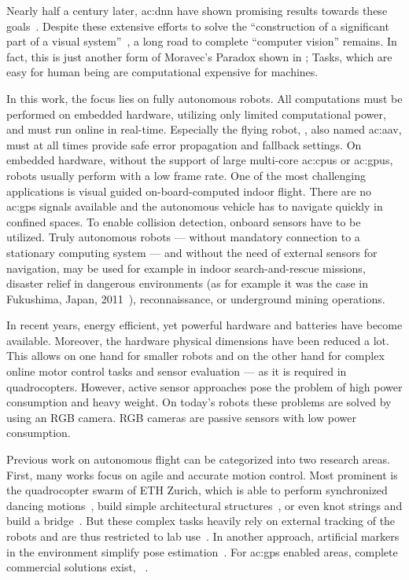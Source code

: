 Nearly half a century later, \acrlong{ac:dnn} have shown promising results towards these goals~\cite{krizhevsky2012imagenet, deng2009imagenet, kim2014convolutional}.
Despite these extensive efforts to solve the ``construction of a significant part of a visual system''~\cite[p. 1]{papert1966summer}, a long road to complete ``computer vision'' remains.
In fact, this is just another form of Moravec's Paradox shown in ; Tasks, which are easy for human being are computational expensive for machines.

In this work, the focus lies on fully autonomous robots.
All computations must be performed on embedded hardware, \ie utilizing only limited computational power, and must run online in real-time.
Especially the flying robot, , also named \gls{ac:aav}, must at all times provide safe error propagation and fallback settings.
On embedded hardware, without the support of large multi-core \glspl{ac:cpu} or \glspl{ac:gpu}, robots usually perform with a low frame rate.
One of the most challenging applications is visual guided on-board-computed indoor flight.
There are no \gls{ac:gps} signals available and the autonomous vehicle has to navigate quickly in confined spaces.
To enable collision detection, onboard sensors have to be utilized.
Truly autonomous robots --- without mandatory connection to a stationary computing system --- and without the need of external sensors for navigation, may be used for example in indoor search-and-rescue missions, disaster relief in dangerous environments (as for example it was the case in Fukushima, Japan, 2011~\cite{chino2011preliminary}), reconnaissance, or underground mining operations.

In recent years, energy efficient, yet powerful hardware and batteries have become available.
Moreover, the hardware physical dimensions have been reduced a lot.
This allows on one hand for smaller robots and on the other hand for complex online motor control tasks and sensor evaluation --- as it is required in quadrocopters.
However, active sensor approaches pose the problem of high power consumption and heavy weight.
On today's robots these problems are solved by using an RGB camera.
RGB cameras are passive sensors with low power consumption.

Previous work on autonomous flight can be categorized into two research areas.
First, many works focus on agile and accurate motion control. Most prominent is the quadrocopter swarm of ETH Zurich, which is able to perform synchronized dancing motions~\cite{schSPRI14}, build simple architectural structures~\cite{augugliaro2014flight}, or even knot strings and build a bridge~\cite{augugliaro2015knot}. 
But these complex tasks heavily rely on external tracking of the robots and are thus restricted to lab use~\cite{brescianini2018trajectory}. 
In another approach, artificial markers in the environment simplify pose estimation~\cite{eberli2011vision}. 
For \gls{ac:gps} enabled areas, complete commercial solutions exist, \eg~\cite{vasarhelyi2014outdoor,radiansyah2017quadcopter}.


